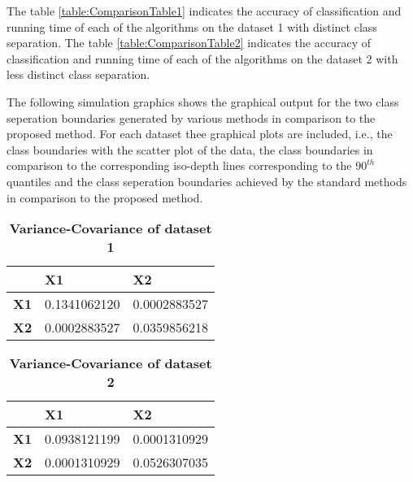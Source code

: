 \documentclass[twoside]{article}
\begin{document}
The table \ref{table:ComparisonTable1} indicates the accuracy of classification and running time of each of the algorithms on the dataset 1 with distinct class separation. The table \ref{table:ComparisonTable2} indicates the accuracy of classification and running time of each of the algorithms on the dataset 2 with less distinct class separation.

The following simulation graphics shows the graphical output for the two class seperation boundaries generated by various methods in comparison to the proposed method. For each dataset thee graphical plots are included, i.e., the class boundaries with the scatter plot of the data, the class boundaries in comparison to the corresponding iso-depth lines corresponding to the $90^{th}$ quantiles and the class seperation boundaries achieved by the standard methods in comparison to the proposed method. 

\onecolumn

\begin{table}[h]
\begin{center}
\caption{\textbf{Variance-Covariance of dataset 1 }}
\begin{tabular}{p{0.5cm}p{2.5cm}p{2.5cm}}\hline
&\textbf{X1}&\textbf{X2}\\ \hline
\textbf{X1}&0.1341062120&0.0002883527\\
\textbf{X2}&0.0002883527&0.0359856218\\ \hline
\end{tabular}
\end{center}
\label{table:Var1}
\end{table}


\begin{table}[h]
\begin{center}
\caption{\textbf{Variance-Covariance of dataset 2 }}
\begin{tabular}{p{0.5cm}p{2.5cm}p{2.5cm}}\hline
&\textbf{X1}&\textbf{X2}\\ \hline
\textbf{X1}&0.0938121199&0.0001310929\\
\textbf{X2}&0.0001310929&0.0526307035\\ \hline
\end{tabular}
\end{center}
\label{table:Var2}
\end{table}
\end{document}
